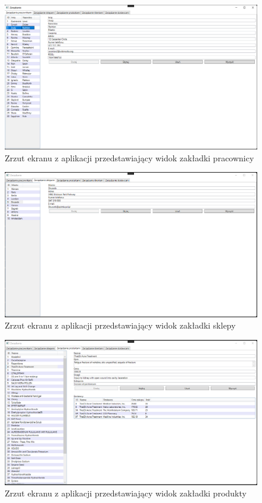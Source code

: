 \documentclass[12pt,a4paper]{article}
\begin{document}
            \begin{figure}[H]
                \centering
                \includegraphics[scale=0.4]{images/pracownicy.png}
                \caption{Zrzut ekranu z aplikacji przedstawiający widok zakładki pracownicy}
            \end{figure}
            
            \begin{figure}[H]
                \centering
                \includegraphics[scale=0.4]{images/sklepy.png}
                \caption{Zrzut ekranu z aplikacji przedstawiający widok zakładki sklepy}
            \end{figure}
            
            \begin{figure}[H]
                \centering
                \includegraphics[scale=0.4]{images/produkty.png}
                \caption{Zrzut ekranu z aplikacji przedstawiający widok zakładki produkty}
            \end{figure}
            
\end{document}
